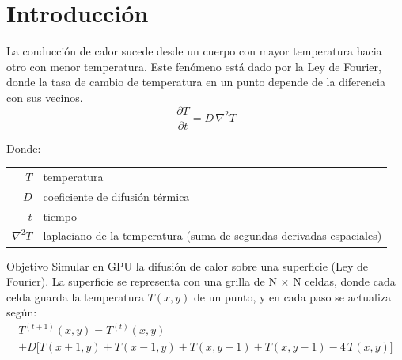 \section{Introducción}
La conducción de calor sucede desde un cuerpo con mayor temperatura hacia otro con menor temperatura. Este fenómeno está dado por la Ley de Fourier, donde la tasa de cambio de temperatura en un punto depende de la diferencia con sus vecinos. 
\begin{equation}
\frac{\partial T}{\partial t} = D \, \nabla^2 T
\label{eq:calor}
\end{equation}

\noindent Donde:
\begin{tabular}{@{}r@{\;:\;}l}
$T$          & temperatura \\
$D$          & coeficiente de difusión térmica \\
$t$          & tiempo \\
$\nabla^2 T$ & laplaciano de la temperatura (suma de segundas derivadas espaciales)
\end{tabular}


\begin{block}{Objetivo}
Simular en GPU la difusión de calor sobre una superficie (Ley de Fourier). La superficie se representa con una grilla de N $\times$ N celdas, donde cada celda guarda la temperatura $T(x,y)$ de un punto, y en cada paso se actualiza según:
\begin{equation}
\begin{gathered}
T^{(t+1)}(x,y) = T^{(t)}(x,y) \\
+ D \bigl[ T(x+1,y) + T(x-1,y) + T(x,y+1) + T(x,y-1) - 4\,T(x,y) \bigr]
\end{gathered}
\label{eq:discreta}
\end{equation}
\end{block}